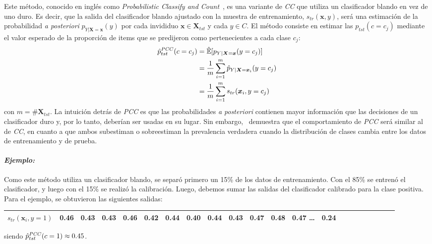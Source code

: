Este método, conocido en inglés como {\it Probabilistic Classify and
Count\/}~\cite{bella2010quantification, tang2010network}, es una variante de
{\it CC\/} que utiliza un clasificador blando en vez de uno duro. Es decir, que
la salida del clasificador blando ajustado con la muestra de entrenamiento,
$s_{tr}(\boldsymbol{x}, y)$, será una estimación de la probabilidad {\it a
posteriori\/} ${p}_{Y|\boldsymbol{X}=\boldsymbol{x}}(y)$ por cada invididuo
$\boldsymbol{x} \in \boldsymbol{X}_{tst}$ y cada $y \in C$. El método consiste
en estimar las ${p}_{tst}(c=c_j)$ mediante el valor esperado de la proporción de
items que se predijeron como pertenecientes a cada clase $c_j$:
\begin{align}
\begin{split}
    \hat p^{\it PCC\/}_{tst}(c=c_j) &= \mathbb{\hat E}[p_{Y|\boldsymbol{X}=\boldsymbol{x}}(y=c_j)] \\
    &= \frac{1}{m} \sum \limits_{i=1}^{m}{\hat p_{Y|\boldsymbol{X}=\boldsymbol{x}_i}(y=c_j)} \\
    &= \frac{1}{m} \sum \limits_{i=1}^{m}{s_{tr}(\boldsymbol{x}_i, y=c_j)}
\end{split}
\end{align}
con $m=\#\boldsymbol{X}_{tst}$. La intuición detrás de {\it PCC\/} es que las
probabilidades {\it a posteriori\/} contienen mayor información que las
decisiones de un clasificador duro y, por lo tanto, deberían ser usadas en su
lugar. Sin embargo,~\citet[Corolario 6, p.157 y p.163]{tasche2014exact}
demuestra que el comportamiento de {\it PCC\/} será similar al de {\it CC}, en
cuanto a que ambos subestiman o sobreestiman la prevalencia verdadera cuando la
distribución de clases cambia entre los datos de entrenamiento y de prueba.

\paragraph{\it Ejemplo:\/} Como este método utiliza un clasificador blando, se
separó primero un 15\% de los datos de entrenamiento. Con el 85\% se entrenó el
clasificador, y luego con el 15\% se realizó la calibración. Luego, debemos
sumar las salidas del clasificador calibrado para la clase positiva. Para el
ejemplo, se obtuvieron las siguientes salidas:
\begin{center}
    \begin{tabular}{lrrrrrrrrrrrrrrrrrrrrr}
        \toprule
        \textbf{$s_{tr}(\boldsymbol{x}_i, y=1)$} & 0.46 & 0.43 & 0.43 & 0.46 &
        0.42 & 0.44 & 0.40 & 0.44 & 0.43 & 0.47 & 0.48 & 0.47 \ldots & 0.24 \\
        \bottomrule
    \end{tabular}
\end{center}
siendo $\hat p^{\it PCC\/}_{tst}(c=1) \approx 0.45$.


